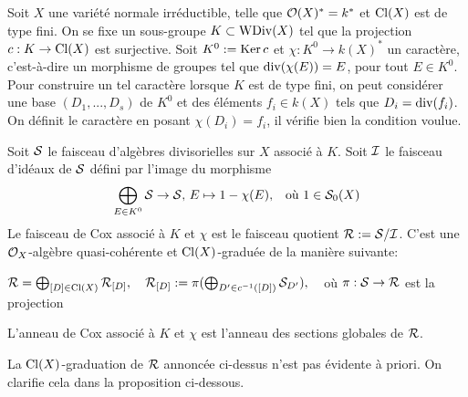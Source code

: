 \begin{cons}\label{conscoxtorsion}
Soit $X$ une variété normale irréductible, telle que $\mathcal{O}(X)^*=k^*$ et $\operatorname{Cl}(X)$ est de type fini. On se fixe un sous-groupe $K\subset \operatorname{WDiv}(X)$ tel que la projection $c:K\rightarrow \operatorname{Cl}(X)$ est surjective. Soit $K^0:=\operatorname{Ker} c$ et $\chi:K^0\rightarrow k(X)^*$ un caractère, c'est-à-dire un morphisme de groupes tel que $\operatorname{div}(\chi(E))=E$, pour tout $E\in K^0$. Pour construire un tel caractère lorsque $K$ est de type fini, on peut considérer une base $(D_1,...,D_s)$ de $K^0$ et des éléments $f_i\in k(X)$ tels que $D_i=\operatorname{div}(f_i)$. On définit le caractère en posant $\chi(D_i)=f_i$, il vérifie bien la condition voulue.

Soit $\mathcal{S}$ le faisceau d'algèbres divisorielles sur $X$ associé à $K$. Soit $\mathcal{I}$ le faisceau d'idéaux de $\mathcal{S}$ défini par l'image du morphisme 
$$\bigoplus_{E\in K^0}\mathcal{S}\rightarrow \mathcal{S},\, E\mapsto 1-\chi(E),\,\,\, \text{ où }1\in \mathcal{S}_0(X)$$
Le faisceau de Cox associé à $K$ et $\chi$ est le faisceau quotient $\mathcal{R}:=\mathcal{S}/\mathcal{I}$. C'est une $\mathcal{O}_X$-algèbre quasi-cohérente et $\operatorname{Cl}(X)$-graduée de la manière suivante: 
\begin{center}
$\mathcal{R}=\bigoplus_{[D]\in \operatorname{Cl}(X)}\mathcal{R}_{[D]},\,\,\,\,\,\, \mathcal{R}_{[D]}:=\pi(\bigoplus_{D'\in c^{-1}([D])}\mathcal{S}_{D'}),\,\,\,\,\,$ où $\pi:\mathcal{S}\rightarrow \mathcal{R}$ est la projection
\end{center}

\noindent L'anneau de Cox associé à $K$ et $\chi$ est l'anneau des sections globales de $\mathcal{R}$.
\end{cons}

La $\operatorname{Cl}(X)$-graduation de $\mathcal{R}$ annoncée ci-dessus n'est pas évidente à priori. On clarifie cela dans la proposition ci-dessous.

